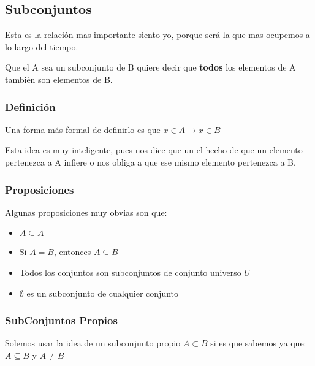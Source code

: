 \documentclass[12pt]{report}                                    %
\begin{document}
            \clearpage
            \subsection{Subconjuntos}

                Esta es la relación mas importante siento yo, porque será la que mas ocupemos a lo largo
                del tiempo.

                Que el A sea un subconjunto de B quiere decir que \textbf{todos} los elementos de A
                también son elementos de B.

                \subsubsection{Definición}

                    Una forma más formal de definirlo es que $x \in A \to x \in B$

                    Esta idea es muy inteligente, pues nos dice que un el hecho de que
                    un elemento pertenezca a A infiere o nos obliga a que ese mismo
                    elemento pertenezca a B.


                \subsubsection{Proposiciones}

                    Algunas proposiciones muy obvias son que:
                    \begin{itemize}
                        \item $A \subseteq A$
                        \item Si $A = B$, entonces $A \subseteq B$
                        \item Todos los conjuntos son subconjuntos de conjunto universo $U$
                        \item $\emptyset$ es un subconjunto de cualquier conjunto
                    \end{itemize}

                \subsubsection{SubConjuntos Propios}

                    Solemos usar la idea de un subconjunto propio $A \subset B$ si es que sabemos ya que:
                    $A \subseteq B$ y $A \neq B$
\end{document}
